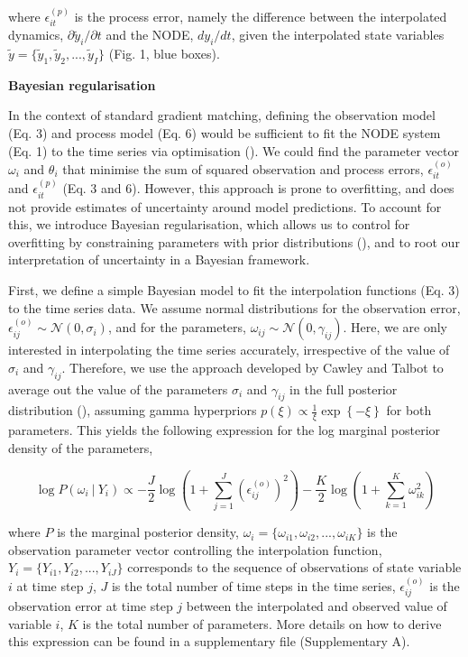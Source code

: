 \documentclass[11pt, oneside]{article}
\begin{document}
where $\epsilon^{(p)}_{it}$ is the process error, namely the difference between the interpolated dynamics, $\partial \tilde{y}_i/\partial t$ and the NODE, $dy_i/dt$, given the interpolated state variables $\tilde{y} = \{\tilde{y}_1,\tilde{y}_2, ...,\tilde{y}_I\}$ (Fig. 1, blue boxes). 

\textbf{Bayesian regularisation}

In the context of standard gradient matching, defining the observation model (Eq. 3) and process model (Eq. 6) would be sufficient to fit the NODE system (Eq. 1) to the time series via optimisation (\cite{Jost2000,Ellner2002,Wu2005}).
We could find the parameter vector $\omega_i$ and $\theta_i$ that minimise the sum of squared observation and process errors, $\epsilon_{it}^{(o)}$ and $\epsilon_{it}^{(p)}$ (Eq. 3 and 6).
However, this approach is prone to overfitting, and does not provide estimates of uncertainty around model predictions. 
To account for this, we introduce Bayesian regularisation, which allows us to control for overfitting by constraining parameters with prior distributions (\cite{Cawley2007}), and to root our interpretation of uncertainty in a Bayesian framework.

First, we define a simple Bayesian model to fit the interpolation functions (Eq. 3) to the time series data.
We assume normal distributions for the observation error, $\epsilon^{(o)}_{ij} \sim \mathcal{N}(0,\sigma_i)$, and for the parameters, $\omega_{ij} \sim \mathcal{N}(0,\gamma_{ij})$.
Here, we are only interested in interpolating the time series accurately, irrespective of the value of $\sigma_i$ and $\gamma_{ij}$.
Therefore, we use the approach developed by Cawley and Talbot to average out the value of the parameters $\sigma_i$ and $\gamma_{ij}$ in the full posterior distribution (\cite{Cawley2007}), assuming gamma hyperpriors $p(\xi) \propto \frac{1}{\xi} \exp\left\{- \xi \right\}$ for both parameters.
This yields the following expression for the log marginal posterior density of the parameters,

\vspace{-0.5cm}
\begin{equation}
    \log P(\omega_i ~|~ Y_i) \propto - \frac{J}{2} \log \left(1 + \sum_{j=1}^{J} \left( \epsilon^{(o)}_{ij} \right)^2 \right) - \frac{K}{2} \log \left(1 + \sum_{k=1}^{K} \omega_{ik}^2 \right)
\end{equation}

where $P$ is the marginal posterior density,
$\omega_i = \{\omega_{i1},\omega_{i2},...,\omega_{iK}\}$ is the observation parameter vector controlling the interpolation function,
$Y_i = \{Y_{i1},Y_{i2},...,Y_{iJ}\}$ corresponds to the sequence of observations of state variable $i$ at time step $j$, 
$J$ is the total number of time steps in the time series, 
$\epsilon^{(o)}_{ij}$ is the observation error at time step $j$ between the interpolated and observed  value of variable $i$, 
$K$ is the total number of parameters. 
More details on how to derive this expression can be found in a supplementary file (Supplementary A).
\end{document}
